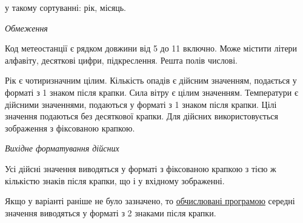 \documentclass[11pt, ukrainian]{article}
\begin{document}
{\noindent}у такому сортуванні: рік, місяць.


\bigskip\textit{Обмеження}

Код метеостанції є рядком довжини від 5 до 11 включно.
Може містити літери алфавіту, десяткові цифри, підкреслення. Решта полів числові.

Рік є чотиризначним цілим.
Кількість опадів є дійсним значенням, подається у форматі з 1 знаком після крапки.
Сила вітру є цілим значенням.
Температури є дійсними значеннями, подаються у форматі з 1 знаком після крапки.
Цілі значення подаються без десяткової крапки.
Для дійсних використовується зображення з фіксованою крапкою.

\textit{Вихідне форматування дійсних}

Усі дійсні значення виводяться у форматі з фіксованою крапкою з тією ж кількістю знаків після крапки, що і у вхідному зображенні.

Якщо у варіанті раніше не було зазначено, то \underline{обчислювані програмою} середні значення виводяться у форматі з 2 знаками після крапки.


\par
\newpage
\end{document}
